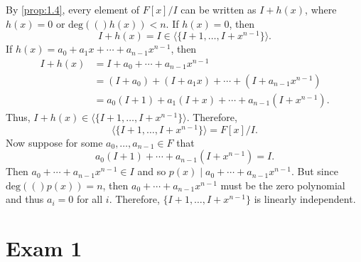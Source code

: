 \documentclass[leqno]{article}
\makeatletter
\newcommand{\deg}[1]{\text{deg}(#1)}
\theoremstyle{definition}
\theoremstyle{remark}
\let\oldproofname=\proofname
\renewcommand{\proofname}{\textit{\oldproofname}}
\theoremstyle{definition}
\renewenvironment{proof}[1][\proofname]{\par
  \pushQED{\qed}%
  \normalfont \topsep6\p@\@plus6\p@\relax
  \list{}{\leftmargin=0mm
          \rightmargin=0mm
          \settowidth{\itemindent}{\itshape#1}%
          \labelwidth=\itemindent
          \parsep=0pt \listparindent=0mm%
  }
  \item[\hskip\labelsep
        \itshape
    #1\@addpunct{.}]\ignorespaces
}{%
  \popQED\endlist\@endpefalse
}
\makeatother
\begin{document}
        \begin{proof}
            By \cref{prop:1.4}, every element of $F[x]/I$ can be written as $I+h(x)$, where $h(x)=0$ or $\deg(h(x))<n$. If $h(x)=0$, then
                \begin{equation*}
                    I+h(x)=I\in\langle\{I+1,\dots,I+x^{n-1}\}\rangle.
                \end{equation*}
            If $h(x)=a_0+a_1x+\cdots+a_{n-1}x^{n-1}$, then 
                \begin{equation*}
                    \begin{split}
                        I+h(x)&=I+a_0+\cdots+a_{n-1}x^{n-1} \\
                        &=(I+a_0)+(I+a_1x)+\cdots+(I+a_{n-1}x^{n-1}) \\
                        &=a_0(I+1)+a_1(I+x)+\cdots+a_{n-1}(I+x^{n-1}).
                    \end{split}
                \end{equation*}
            Thus, $I+h(x)\in\langle\{I+1,\dots,I+x^{n-1}\}\rangle$. Therefore,
                \begin{equation*}
                    \langle\{I+1,\dots,I+x^{n-1}\}\rangle=F[x]/I.
                \end{equation*}
            Now suppose for some $a_0,\dots,a_{n-1}\in F$ that 
                \begin{equation*}
                    a_0(I+1)+\cdots+a_{n-1}(I+x^{n-1})=I.
                \end{equation*}
            Then $a_0+\cdots+a_{n-1}x^{n-1}\in I$ and so $p(x)\mid a_0+\cdots+a_{n-1}x^{n-1}$. But since $\deg(p(x))=n$, then $a_0+\cdots+a_{n-1}x^{n-1}$ must be the zero polynomial and thus $a_i=0$ for all $i$. Therefore, $\{I+1,\dots,I+x^{n-1}\}$ is linearly independent.
        \end{proof}
\section{Exam 1}
\end{document}
